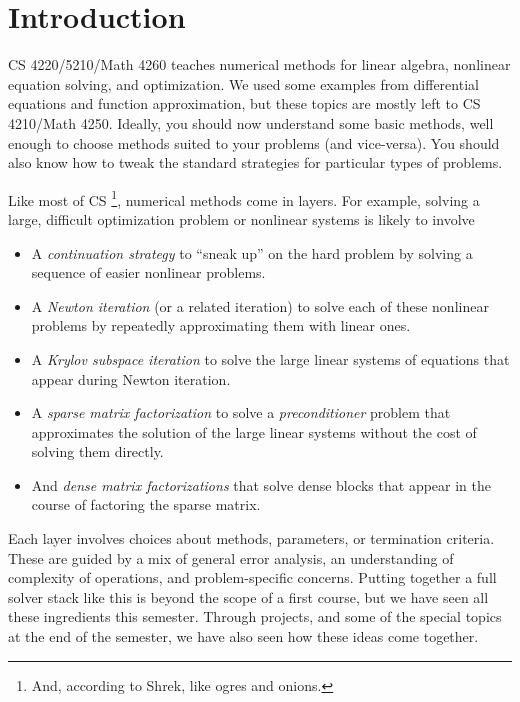 \documentclass[12pt, leqno]{article}
\begin{document}
\lstset{language=matlab,columns=flexible}  

\section{Introduction}

CS 4220/5210/Math 4260 teaches numerical methods for linear algebra,
nonlinear equation solving, and optimization.  We used some examples
from differential equations and function approximation, but these
topics are mostly left to CS 4210/Math 4250.  Ideally, you should now
understand some basic methods, well enough to choose methods suited to
your problems (and vice-versa).  You should also know how to tweak the
standard strategies for particular types of problems.

Like most of CS%
\footnote{And, according to Shrek, like ogres and onions.}, numerical
methods come in layers.  For example, solving a large, difficult
optimization problem or nonlinear systems is likely to involve
\begin{itemize}
  \item A {\em continuation strategy} to ``sneak up'' on the hard
    problem by solving a sequence of easier nonlinear problems.
  \item A {\em Newton iteration} (or a related iteration) to solve
    each of these nonlinear problems by repeatedly approximating them
    with linear ones.
  \item A {\em Krylov subspace iteration} to solve the large linear
    systems of equations that appear during Newton iteration.
  \item A {\em sparse matrix factorization} to solve a {\em
    preconditioner} problem that approximates the solution of the
    large linear systems without the cost of solving them directly.
  \item And {\em dense matrix factorizations} that solve dense
    blocks that appear in the course of factoring the sparse matrix.
\end{itemize}
Each layer involves choices about methods, parameters, or termination
criteria.  These are guided by a mix of general error analysis, an
understanding of complexity of operations, and problem-specific
concerns.  Putting together a full solver stack like this is beyond
the scope of a first course, but we have seen all these ingredients
this semester.  Through projects, and some of the special topics at
the end of the semester, we have also seen how these ideas come
together.
\end{document}
